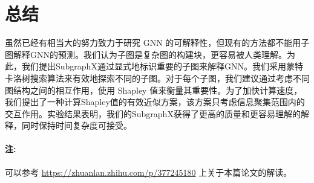 \documentclass[final]{cvpr}
\begin{document}

\section{总结}\label{sec:Conclusion}

虽然已经有相当大的努力致力于研究 GNN 的可解释性，但现有的方法都不能用子图解释GNN的预测。我们认为子图是复杂图的构建块，更容易被人类理解。为此，我们提出SubgraphX通过显式地标识重要的子图来解释GNN。我们采用蒙特卡洛树搜索算法来有效地探索不同的子图。对于每个子图，我们建议通过考虑不同图结构之间的相互作用，使用 Shapley 值来衡量其重要性。为了加快计算速度，我们提出了一种计算Shapley值的有效近似方案，该方案只考虑信息聚集范围内的交互作用。实验结果表明，我们的SubgraphX获得了更高的质量和更容易理解的解释，同时保持时间复杂度可接受。

\paragraph{注:} 可以参考 \url{https://zhuanlan.zhihu.com/p/377245180} 上关于本篇论文的解读。

{\small


}

\end{document}
